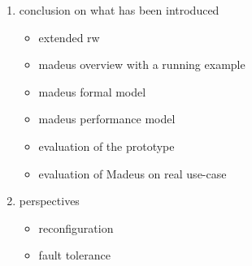 \begin{enumerate}
\item conclusion on what has been introduced
  \begin{itemize}
  \item extended rw
  \item madeus overview with a running example
  \item madeus formal model
  \item madeus performance model
  \item evaluation of the prototype
  \item evaluation of Madeus on real use-case
  \end{itemize}
\item perspectives
  \begin{itemize}
  \item reconfiguration
  \item fault tolerance
  \end{itemize}
\end{enumerate}
  